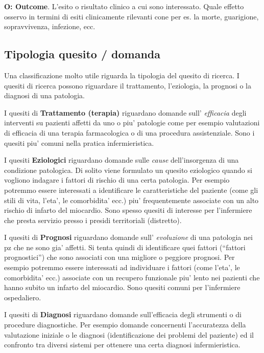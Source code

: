 \documentclass[]{book}
\begin{document}
\textbf{O: Outcome}. L'esito o risultato clinico a cui sono interessato. Quale effetto osservo in termini di esiti clinicamente rilevanti cone per es. la morte, guarigione, sopravvivenza, infezione, ecc.

\hypertarget{tipologia-quesito-domanda}{%
\subsection{Tipologia quesito / domanda}\label{tipologia-quesito-domanda}}

Una classificazione molto utile riguarda la tipologia del quesito di ricerca. I quesiti di ricerca possono riguardare il trattamento, l'eziologia, la prognosi o la diagnosi di una patologia.

I quesiti di \textbf{Trattamento (terapia)} riguardano domande sull' \emph{efficacia} degli interventi su pazienti affetti da uno o piu' patologie come per esempio valutazioni di efficacia di una terapia farmacologica o di una procedura assistenziale. Sono i quesiti piu' comuni nella pratica infermieristica.

I quesiti \textbf{Eziologici} riguardano domande sulle \emph{cause} dell'insorgenza di una condizione patologica. Di solito viene formulato un quesito eziologico quando si vogliono indagare i fattori di rischio di una certa patologia. Per esempio potremmo essere interessati a identificare le caratteristiche del paziente (come gli stili di vita, l'eta', le comorbidita' ecc.) piu' frequentemente associate con un alto rischio di infarto del miocardio. Sono spesso quesiti di interesse per l'infermiere che presta servizio presso i presidi territoriali (distretto).

I quesiti di \textbf{Prognosi} riguardano domande sull' \emph{evoluzione} di una patologia nei pz che ne sono gia' affetti. Si tenta quindi di identificare quei fattori (``fattori prognostici'') che sono associati con una migliore o peggiore prognosi. Per esempio potremmo essere interessati ad individuare i fattori (come l'eta', le comorbidita' ecc.) associate con un recupero funzionale piu' lento nei pazienti che hanno subito un infarto del miocardio. Sono quesiti comuni per l'infermiere ospedaliero.

I quesiti di \textbf{Diagnosi} riguardano domande sull'efficacia degli strumenti o di procedure diagnostiche. Per esempio domande concernenti l'accuratezza della valutazione iniziale o le diagnosi (identificazione dei problemi del paziente) ed il confronto tra diversi sistemi per ottenere una certa diagnosi infermieristica.
\end{document}
